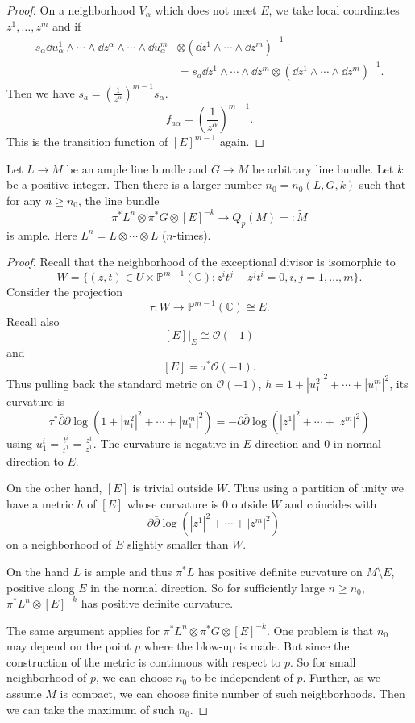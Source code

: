 \documentclass[12pt]{article}
\begin{document}
\begin{proof}
  On a neighborhood \(V_\alpha\) which does not meet \(E\), we take local
  coordinates \(z^1,\ldots,z^m\) and if
  \begin{align*}
    s_\alpha\dd{u_\alpha^1}\wedge\cdots\wedge\dd{z^\alpha}\wedge\cdots\wedge
    \dd{u_\alpha^m}&\otimes (\dd{z^1}\wedge\cdots\wedge\dd{z^m})^{-1} \\
    &=s_a\dd{z^1}\wedge\cdots\wedge\dd{z^m}
    \otimes (\dd{z^1}\wedge\cdots\wedge\dd{z^m})^{-1}
  .\end{align*}
  Then we have \(s_a=\left(\frac{1}{z^\alpha}\right)^{m-1}s_{\alpha}\).
  \ie\ \[
    f_{a\alpha}=\left(\frac{1}{z^\alpha}\right)^{m-1}
  .\] This is the transition function of \([E]^{m-1}\) again.
\end{proof}

\begin{lemma}\label{lem:20-ample}
  Let \(L\to M\) be an ample line bundle and \(G\to M\) be arbitrary line bundle.
  Let \(k\) be a positive integer. Then there is a larger number \(n_0=
  n_0(L,G,k)\) such that for any \(n\ge n_0\), the line bundle \[
    \pi^* L^n\otimes \pi^* G \otimes [E]^{-k}\to Q_p(M)=:\tilde{M}
  \] is ample. Here \(L^n=L\otimes\cdots\otimes L\) (\(n\)-times).
\end{lemma}
\begin{proof}
  Recall that the neighborhood of the exceptional divisor is isomorphic to \[
    W=\{(z,t)\in U\times \mathbb{P}^{m-1}(\mathbb{C}):z^i t^j-z^j t^i=0,
    i,j=1,\ldots,m\}
  .\] Consider the projection \[
    \tau\colon W\to \mathbb{P}^{m-1}(\mathbb{C})\cong E
  .\] Recall also \[
  [E]\big|_{E}\cong \mathcal{O}(-1)
  \] and \[
    [E]=\tau^* \mathcal{O}(-1)
  .\] Thus pulling back the standard metric on \(\mathcal{O}(-1)\), 
  \(h=1+|u_1^2|^2+\cdots +|u_1^m|^2\), its curvature is \[
    \tau^* \bar{\partial}\partial\log(1+|u_1^2|^2+\cdots+|u_1^m|^2)
    =-\partial\bar{\partial}\log(|z^1|^2+\cdots +|z^m|^2)
  \] using \(u_1^i=\frac{t^i}{t^1}=\frac{z^i}{z^1}\). The curvature is negative
  in \(E\) direction and \(0\) in normal direction to \(E\).

  On the other hand, \([E]\) is trivial outside \(W\). Thus using a partition
  of unity we have a metric \(h\) of \([E]\) whose curvature is \(0\) outside
  \(W\) and coincides with \[
    -\partial\bar{\partial}\log(|z^1|^2+\cdots+|z^m|^2)
  \] on a neighborhood of \(E\) slightly smaller than \(W\).

  On the hand \(L\) is ample and thus \(\pi^*L\) has positive definite curvature
  on \(M\setminus E\), positive along \(E\) in the normal direction. So for
  sufficiently large \(n\ge n_0\), \(\pi^*L^n\otimes [E]^{-k}\) has positive
  definite curvature.

  The same argument applies for \(\pi^*L^n\otimes \pi^*G\otimes [E]^{-k}\).
  One problem is that \(n_0\) may depend on the point \(p\) where the blow-up
  is made. But since the construction of the metric is continuous with respect
  to \(p\). So for small neighborhood of \(p\), we can choose \(n_0\) to be
  independent of \(p\). Further, as we assume \(M\) is compact, we can choose
  finite number of such neighborhoods. Then we can take the maximum of such
  \(n_0\).
\end{proof}
\end{document}
